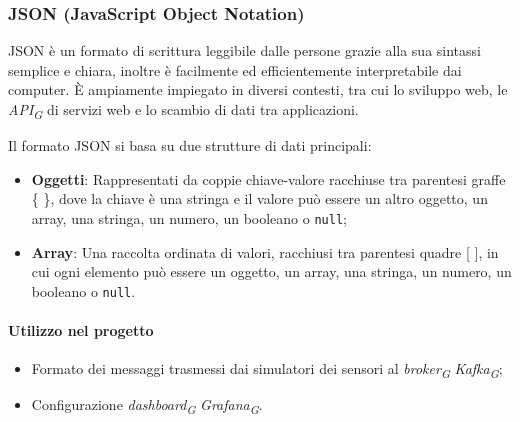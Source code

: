 \subsubsection{JSON (JavaScript Object Notation)}
JSON è un formato di scrittura leggibile dalle persone grazie alla sua sintassi semplice e chiara, inoltre è facilmente ed efficientemente interpretabile dai computer. È ampiamente impiegato in diversi contesti, tra cui lo sviluppo web, le \textit{API}\textsubscript{\textit{G}} di servizi web e lo scambio di dati tra applicazioni.

Il formato JSON si basa su due strutture di dati principali:

\begin{itemize}
  \item \textbf{Oggetti}: Rappresentati da coppie chiave-valore racchiuse tra parentesi graffe \{ \}, dove la chiave è una stringa e il valore può essere un altro oggetto, un array, una stringa, un numero, un booleano o \texttt{null};
  \item \textbf{Array}: Una raccolta ordinata di valori, racchiusi tra parentesi quadre [ ], in cui ogni elemento può essere un oggetto, un array, una stringa, un numero, un booleano o \texttt{null}.
\end{itemize}

\paragraph{Utilizzo nel progetto}
\begin{itemize}
  \item Formato dei messaggi trasmessi dai simulatori dei sensori al \textit{broker}\textsubscript{\textit{G}} \textit{Kafka}\textsubscript{\textit{G}};
  \item Configurazione \textit{dashboard}\textsubscript{\textit{G}} \textit{Grafana}\textsubscript{\textit{G}}.
\end{itemize}
